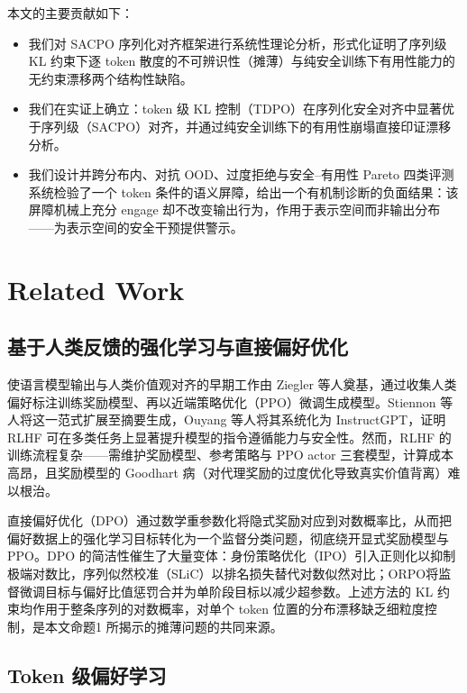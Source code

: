\documentclass[lettersize,journal]{IEEEtran}
\begin{document}
本文的主要贡献如下：
\begin{itemize}
    \item 我们对 SACPO 序列化对齐框架进行系统性理论分析，形式化证明了序列级 KL 约束下逐 token 散度的不可辨识性（摊薄）与纯安全训练下有用性能力的无约束漂移两个结构性缺陷。

    \item 我们在实证上确立：token 级 KL 控制（TDPO）在序列化安全对齐中显著优于序列级（SACPO）对齐，并通过纯安全训练下的有用性崩塌直接印证漂移分析。

    \item 我们设计并跨分布内、对抗 OOD、过度拒绝与安全–有用性 Pareto 四类评测系统检验了一个 token 条件的语义屏障，给出一个有机制诊断的负面结果：该屏障机械上充分 engage 却不改变输出行为，作用于表示空间而非输出分布——为表示空间的安全干预提供警示。
\end{itemize}

\section{Related Work}

\subsection{基于人类反馈的强化学习与直接偏好优化}

使语言模型输出与人类价值观对齐的早期工作由 Ziegler 等人\cite{ziegler2019fine}奠基，通过收集人类偏好标注训练奖励模型、再以近端策略优化（PPO）\cite{schulman2017proximal}微调生成模型。Stiennon 等人\cite{stiennon2020learning}将这一范式扩展至摘要生成，Ouyang 等人\cite{ouyang2022training}将其系统化为 InstructGPT，证明 RLHF 可在多类任务上显著提升模型的指令遵循能力与安全性。然而，RLHF 的训练流程复杂——需维护奖励模型、参考策略与 PPO actor 三套模型，计算成本高昂，且奖励模型的 Goodhart 病（对代理奖励的过度优化导致真实价值背离）难以根治\cite{gao2023scaling}。

直接偏好优化（DPO）\cite{rafailov2023direct}通过数学重参数化将隐式奖励对应到对数概率比，从而把偏好数据上的强化学习目标转化为一个监督分类问题，彻底绕开显式奖励模型与 PPO。DPO 的简洁性催生了大量变体：身份策略优化（IPO）\cite{azar2024general}引入正则化以抑制极端对数比，序列似然校准（SLiC）\cite{zhao2023slic}以排名损失替代对数似然对比；ORPO\cite{hong2024orpo}将监督微调目标与偏好比值惩罚合并为单阶段目标以减少超参数。上述方法的 KL 约束均作用于整条序列的对数概率，对单个 token 位置的分布漂移缺乏细粒度控制，是本文命题1 所揭示的摊薄问题的共同来源。

\subsection{Token 级偏好学习}
\end{document}
